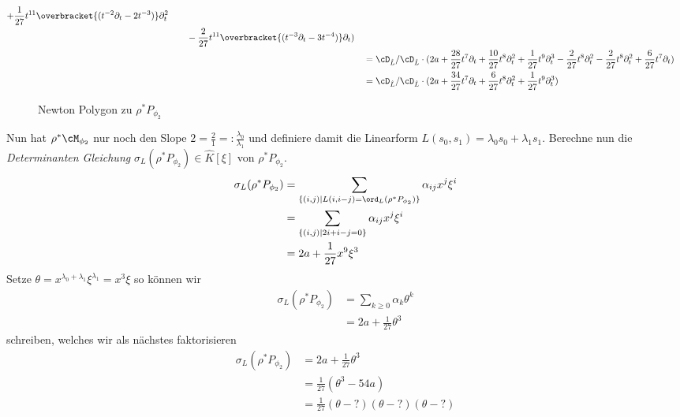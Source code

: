 \begin{align*}
\begin{aligned}
    +\frac{1}{27}t^{11}\overbracket{(t^{-2}\partial_t-2t^{-3})}\partial_t^2\\
    &\qquad-\frac{2}{27}t^{11}\overbracket{(t^{-3}\partial_t-3t^{-4})}
      \partial_t
  )
\end{aligned}\\
&= \cD_{\hat L}/\cD_{\hat L}\cdot(2a+
  \frac{28}{27}t^7\partial_t
  +\frac{10}{27}t^{8}\partial_t^2
  +\frac{1}{27}t^{9}\partial_t^3-\frac{2}{27}t^{8}\partial_t^2
  -\frac{2}{27}t^{8}\partial_t^2 +\frac{6}{27}t^{7}\partial_t
)\\
&= \cD_{\hat L}/\cD_{\hat L}\cdot(2a+ \frac{34}{27}t^7\partial_t
  +\frac{6}{27}t^{8}\partial_t^2 +\frac{1}{27}t^{9}\partial_t^3)
\end{align*}
\begin{figure}[H]
\caption{Newton Polygon zu $\rho^*P_{\phi_2}$}
\begin{center}
\end{center}
\end{figure}
Nun hat $\rho^*\cM_{\phi_2}$ nur noch den Slope
$2=\frac{2}{1}=:\frac{\lambda_0}{\lambda_1}$ und definiere damit die Linearform
$L(s_0,s_1)=\lambda_0s_0+\lambda_1s_1$.  Berechne nun die \emph{Determinanten
Gleichung} $\sigma_L(\rho^*P_{\phi_2})\in \hat
K[\xi]$ von $\rho^*P_{\phi_2}$.
\begin{align*}
\sigma_L(\rho^*P_{\phi_2})
&= \sum_{\{(i,j) \mid L(i,i-j)=\ord_L(\rho^*P_{\phi_2})\}}\alpha_{ij}x^j\xi^i\\
&= \sum_{\{(i,j) \mid 2i + i-j=0\}}\alpha_{ij}x^j\xi^i\\
&= 2a+\frac{1}{27}x^9\xi^3
\end{align*}
Setze $\theta=x^{\lambda_0+\lambda_1}\xi^{\lambda_1}=x^3\xi$ so können wir
\begin{align*}
\sigma_L(\rho^*P_{\phi_2}) &= \sum_{k\geq 0}\alpha_k\theta^k\\
&= 2a+\frac{1}{27}\theta^3
\end{align*}
schreiben, welches wir als nächstes faktorisieren
\begin{align*}
\sigma_L(\rho^*P_{\phi_2}) &= 2a+\frac{1}{27}\theta^3\\
&=\frac{1}{27}(\theta^3-54a)\\
&=\frac{1}{27}(\theta-?)(\theta-?)(\theta-?)\\
\end{align*}

